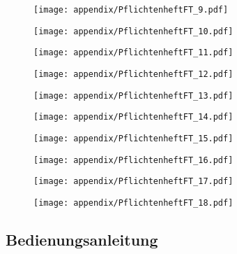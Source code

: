 \begin{appendix}
\begin{figure}[h]
	\centering
	\texttt{[image: appendix/PflichtenheftFT\_9.pdf]}
\end{figure}
\begin{figure}[h]
	\centering
	\texttt{[image: appendix/PflichtenheftFT\_10.pdf]}
\end{figure}
\begin{figure}[h]
	\centering
	\texttt{[image: appendix/PflichtenheftFT\_11.pdf]}
\end{figure}
\begin{figure}[h]
	\centering
	\texttt{[image: appendix/PflichtenheftFT\_12.pdf]}
\end{figure}
\begin{figure}[h]
	\centering
	\texttt{[image: appendix/PflichtenheftFT\_13.pdf]}
\end{figure}
\begin{figure}[h]
	\centering
	\texttt{[image: appendix/PflichtenheftFT\_14.pdf]}
\end{figure}
\begin{figure}[h]
	\centering
	\texttt{[image: appendix/PflichtenheftFT\_15.pdf]}
\end{figure}
\begin{figure}[h]
	\centering
	\texttt{[image: appendix/PflichtenheftFT\_16.pdf]}
\end{figure}
\begin{figure}[h]
	\centering
	\texttt{[image: appendix/PflichtenheftFT\_17.pdf]}
\end{figure}
\begin{figure}[h]
	\centering
	\texttt{[image: appendix/PflichtenheftFT\_18.pdf]}
\end{figure}

\clearpage


\subsection{Bedienungsanleitung}
\label{app:Bedienungsanleitung}
\end{appendix}

